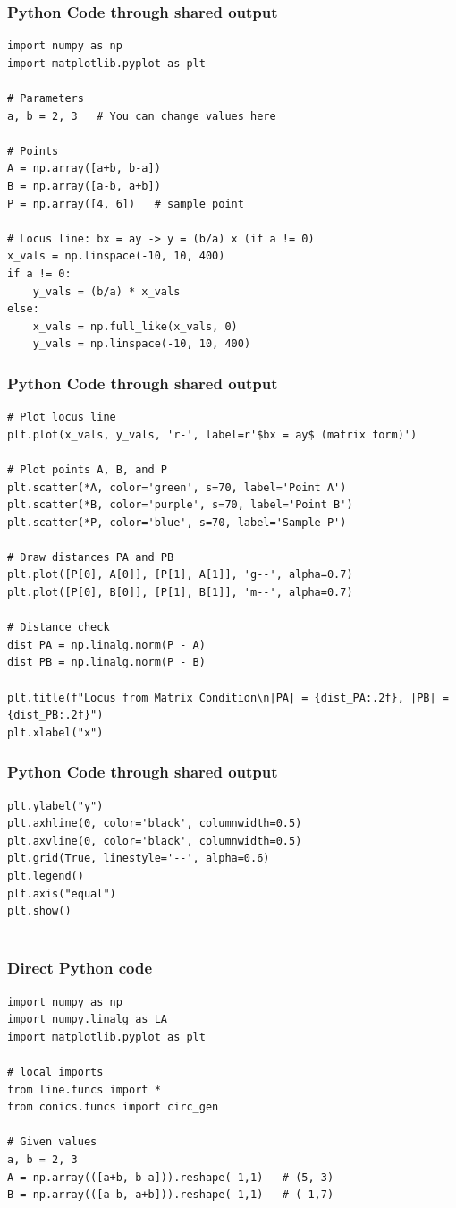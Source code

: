 \documentclass{beamer}
\begin{document}
\begin{frame}[fragile]\frametitle{Python Code through shared output}
\begin{lstlisting}
import numpy as np
import matplotlib.pyplot as plt

# Parameters
a, b = 2, 3   # You can change values here

# Points
A = np.array([a+b, b-a])
B = np.array([a-b, a+b])
P = np.array([4, 6])   # sample point

# Locus line: bx = ay -> y = (b/a) x (if a != 0)
x_vals = np.linspace(-10, 10, 400)
if a != 0:
    y_vals = (b/a) * x_vals
else:
    x_vals = np.full_like(x_vals, 0)
    y_vals = np.linspace(-10, 10, 400)
\end{lstlisting}
\end{frame}
\begin{frame}[fragile]\frametitle{Python Code through shared output}
\begin{lstlisting}
# Plot locus line
plt.plot(x_vals, y_vals, 'r-', label=r'$bx = ay$ (matrix form)')

# Plot points A, B, and P
plt.scatter(*A, color='green', s=70, label='Point A')
plt.scatter(*B, color='purple', s=70, label='Point B')
plt.scatter(*P, color='blue', s=70, label='Sample P')

# Draw distances PA and PB
plt.plot([P[0], A[0]], [P[1], A[1]], 'g--', alpha=0.7)
plt.plot([P[0], B[0]], [P[1], B[1]], 'm--', alpha=0.7)

# Distance check
dist_PA = np.linalg.norm(P - A)
dist_PB = np.linalg.norm(P - B)

plt.title(f"Locus from Matrix Condition\n|PA| = {dist_PA:.2f}, |PB| = {dist_PB:.2f}")
plt.xlabel("x")
\end{lstlisting}
\end{frame}
\begin{frame}[fragile]\frametitle{Python Code through shared output}
\begin{lstlisting}
plt.ylabel("y")
plt.axhline(0, color='black', columnwidth=0.5)
plt.axvline(0, color='black', columnwidth=0.5)
plt.grid(True, linestyle='--', alpha=0.6)
plt.legend()
plt.axis("equal")
plt.show()
  
\end{lstlisting}
\end{frame}
\begin{frame}[fragile]\frametitle{Direct Python code}
\begin{lstlisting}
import numpy as np
import numpy.linalg as LA
import matplotlib.pyplot as plt

# local imports
from line.funcs import *
from conics.funcs import circ_gen

# Given values
a, b = 2, 3
A = np.array(([a+b, b-a])).reshape(-1,1)   # (5,-3)
B = np.array(([a-b, a+b])).reshape(-1,1)   # (-1,7)
\end{lstlisting}
\end{frame}
\end{document}
